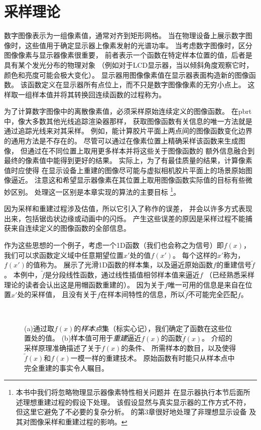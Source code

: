 \section{采样理论}\label{sec:采样理论}
数字图像表示为一组像素值，通常对齐到矩形网格。
当在物理设备上展示数字图像时，这些值用于确定显示器上像素发射的光谱功率。
当考虑数字图像时，区分图像像素与显示器像素很重要，
前者表示一个函数在特定样本位置的值，后者是具有某个发光分布的物理对象
（例如对于LCD显示器，当以倾斜角度观察它时，颜色和亮度可能会极大变化）。
显示器用图像像素值在显示器表面构造新的图像函数。
该函数定义在显示器所有点位上，而不只是数字图像像素的无穷小点上。
这样取一组样本值并将其转换回连续函数的过程称为。

为了计算数字图像中的离散像素值，必须采样原始连续定义的图像函数。
在pbrt中，像大多数其他光线追踪渲染器那样，
获取图像函数有关信息的唯一方法就是通过追踪光线来对其采样。
例如，能计算胶片平面上两点间的图像函数变化边界的通用方法是不存在的。
尽管可以通过在像素位置上精确采样该函数来生成图像，
但通过在不同位置上取用更多样本并将这些关于图像函数的
额外信息融合到最终的像素值中能得到更好的结果。
实际上，为了有最佳质量的结果，计算像素值时应使得
在显示设备上重建的图像尽可能与虚拟相机胶片平面上的场景原始图像逼近。
注意这和希望显示器像素在其位置上取用图像函数实际值的目标有些微妙区别。
处理这一区别是本章实现的算法的主要目标
\footnote{本书中我们将忽略物理显示器像素特性相关问题并
在显示器执行本节后面所述理想重建过程的假设下处理。
该假设显然与真实显示器的工作方式不符，但这里它避免了不必要的复杂分析。
\citet{GLASSNER1995}的第3章很好地处理了非理想显示设备
及其对图像采样和重建过程的影响。}。

因为采样和重建过程涉及估值，所以它引入了称作的误差，
并会以许多方式表现出来，包括锯齿状边缘或动画中的闪烁。
产生这些误差的原因是采样过程不能捕获来自连续定义的图像函数的全部信息。

作为这些思想的一个例子，考虑一个1D函数（我们也会称之为信号）即$f(x)$，
我们可以求函数定义域中任意期望位置$x'$处的值$f(x')$。
每个这样的$x'$称为，
$f(x')$的值称为。
展示了光滑1D函数的样本集，以及逼近原始函数$f$的重建信号$\tilde{f}$。
本例中，$\tilde{f}$是分段线性函数，通过线性插值相邻样本值来逼近$f$
（已经熟悉采样理论的读者会认出这是用帽函数重建的）。
因为关于$f$唯一可用的信息是来自在位置$x'$处的采样值，
且没有关于$f$在样本间特性的信息，所以$\tilde{f}$不可能完全匹配$f$。
\begin{figure}[htbp]
    \centering
    \,
    \caption{(a)通过取$f(x)$的\emph{样本点}集（标实心记），我们确定了函数在这些位置处的值。
    (b)样本值可用于\emph{重建}逼近$f(x)$的函数$\tilde{f}(x)$。
    介绍的采样原理准确描述了关于$f(x)$的条件、
    所需样本的数目，以及使得$\tilde{f}(x)$和$f(x)$一模一样的重建技术。
    原始函数有时能只从样本点中完全重建的事实令人瞩目。}
    \label{fig:7.1}
\end{figure}

